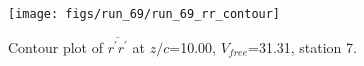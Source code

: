 \begin{figure}[H]
\centering
\texttt{[image: figs/run\_69/run\_69\_rr\_contour]}
\caption{Contour plot of $\overline{r^\prime r^\prime}$ at $z/c$=10.00, $V_{free}$=31.31, station 7.}
\label{fig:run_69_rr_contour}
\end{figure}



